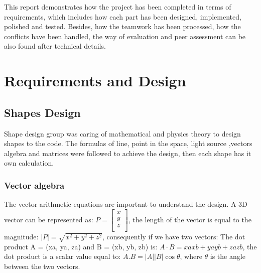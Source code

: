 \documentclass[a4paper, 12pt]{article}
\begin{document}
This report demonstrates how the project has been completed in terms of requirements, which includes how each part has been designed, implemented, polished and tested. Besides, how the teamwork has been processed, how the conflicts have been handled, the way of evaluation and peer assessment can be also found after technical details.





\section{Requirements and Design}

\subsection{Shapes Design}
Shape design group was caring of mathematical and physics theory to design shapes to the code. The formulas of line, point in the space, light source ,vectors algebra and matrices were followed to achieve the design, then each shape has it own calculation.

\subsubsection{Vector algebra}
The vector arithmetic equations are important to understand the design. A 3D vector can be  represented as: $P=\left[\begin{matrix}x\\y\\z\\\end{matrix}\right]$, the length of the vector is equal to the magnitude: $|P|=\sqrt{x^2+y^2+z^2}$, consequently if we have two vectors: The dot product A = (xa, ya, za) and B = (xb, yb, zb) is: $A\cdot B = xa xb + ya yb + za zb$, the dot product is a scalar value equal to: $A.B=\left|A\right||B|\cos{\theta}$, where $\theta$ is the angle between the two vectors.
\end{document}
